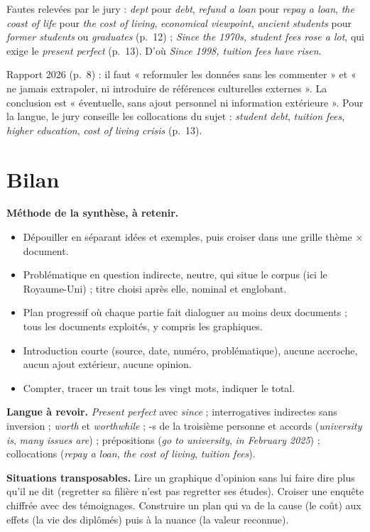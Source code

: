\documentclass[11pt,a4paper]{article}
\providecommand{\tightlist}{\setlength{\itemsep}{0pt}\setlength{\parskip}{0pt}}
\begin{document}
\begin{piege}

Fautes relevées par le jury : \emph{dept} pour \emph{debt}, \emph{refund a loan} pour \emph{repay a loan}, \emph{the coast of life} pour \emph{the cost of living}, \emph{economical viewpoint}, \emph{ancient students} pour \emph{former students} ou \emph{graduates} (p.~12) ; \emph{Since the 1970s, student fees rose a lot}, qui exige le \emph{present perfect} (p.~13). D'où \emph{Since 1998, tuition fees have risen}.

\end{piege}

\begin{jury}

Rapport 2026 (p.~8) : il faut « reformuler les données sans les commenter » et « ne jamais extrapoler, ni introduire de références culturelles externes ». La conclusion est « éventuelle, sans ajout personnel ni information extérieure ». Pour la langue, le jury conseille les collocations du sujet : \emph{student debt}, \emph{tuition fees}, \emph{higher education}, \emph{cost of living crisis} (p.~13).

\end{jury}

\hypertarget{bilan}{%
\section{Bilan}\label{bilan}}

\textbf{Méthode de la synthèse, à retenir.}

\begin{itemize}
\tightlist
\item
  Dépouiller en séparant idées et exemples, puis croiser dans une grille thème × document.
\item
  Problématique en question indirecte, neutre, qui situe le corpus (ici le Royaume-Uni) ; titre choisi après elle, nominal et englobant.
\item
  Plan progressif où chaque partie fait dialoguer au moins deux documents ; tous les documents exploités, y compris les graphiques.
\item
  Introduction courte (source, date, numéro, problématique), aucune accroche, aucun ajout extérieur, aucune opinion.
\item
  Compter, tracer un trait tous les vingt mots, indiquer le total.
\end{itemize}

\textbf{Langue à revoir.} \emph{Present perfect} avec \emph{since} ; interrogatives indirectes sans inversion ; \emph{worth} et \emph{worthwhile} ; -s de la troisième personne et accords (\emph{university is}, \emph{many issues are}) ; prépositions (\emph{go to university}, \emph{in February 2025}) ; collocations (\emph{repay a loan}, \emph{the cost of living}, \emph{tuition fees}).

\textbf{Situations transposables.} Lire un graphique d'opinion sans lui faire dire plus qu'il ne dit (regretter sa filière n'est pas regretter ses études). Croiser une enquête chiffrée avec des témoignages. Construire un plan qui va de la cause (le coût) aux effets (la vie des diplômés) puis à la nuance (la valeur reconnue).
\end{document}
